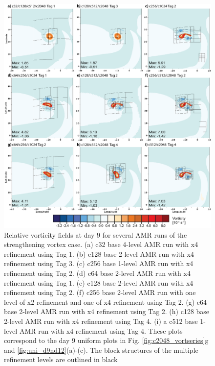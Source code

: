 \begin{figure}
   \centerline{%
   \noindent
   \includegraphics[width=\textwidth]{Chap2/day9_vort-01.eps}}
   \caption{Relative vorticity fields at day 9 for several AMR runs of the 
   strengthening vortex case. (a) c32 base 4-level AMR run with x4 
   refinement using Tag 1. (b) c128 base 2-level AMR run with
   x4 refinement using Tag 3.
   (c) c256 base 1-level AMR run with x4 refinement using Tag 2.
   (d) c64 base 2-level AMR run with x4 refinement using Tag 1.
   (e) c128 base 2-level AMR run with x4 refinement using Tag 2.
   (f) c256 base 2-level AMR run with one level of x2 refinement 
   and one of x4 refinement using Tag 2.
   (g) c64 base 2-level AMR run with x4 refinement using Tag 2.
   (h) c128 base 2-level AMR run with x4 refinement using Tag 4.
   (i) a c512 base 1-level AMR run with x4 refinement using Tag 4. These plots
   correspond to the day 9 uniform plots in Fig. \ref{fig:c2048_vortseries}g and
   \ref{fig:uni_d9nd12}(a)-(c). The block structures of the multiple refinement
   levels are outlined in black
   }
   \label{fig:vort_amr_day9}
\end{figure}

